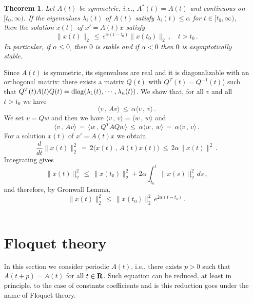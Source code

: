 \documentclass[12pt]{report}
\newcommand{\bR}{{\bf R}}
\newtheorem{theorem}{Theorem}[section]
\newcommand{\proof}{\noindent {\em Proof:~}}
\def\qed{\hbox{\hskip 6pt\vrule width6pt height7pt depth1pt
    \hskip1pt}\bigskip}
\begin{document}
\begin{theorem} Let $A(t)$ be symmetric, i.e., $A^{*}(t) =A(t)$ and 
continuous on $[t_0, \infty)$. If the eigenvalues $\lambda_i(t)$ of 
$A(t)$ satisfy $\lambda_i(t) \le \alpha$ for $t \in [t_0, \infty)$, 
then the solution $x(t)$ of $x'=A(t) x$ satisfy
\begin{equation}
\|x(t) \|_2 \,\le\, e^{\alpha(t-t_0)} \|x(t_0)\|_2 \,, \quad t>t_0\,.
\end{equation}
In particular, if $\alpha \le 0$, then $0$ is stable and if $\alpha < 0$ 
then $0$ is asymptotically stable. 
\end{theorem}

\proof Since $A(t)$ is symmetric, its eigenvalues are real and it is
diagonalizable with an orthogonal matrix: there exists a matrix $Q(t)$ with  
$Q^T(t) = Q^{-1}(t)$) such that $Q^T(t) A(t) Q(t) = {\rm diag}(\lambda_1(t),
\cdots, \lambda_n(t))$.  We show that, for all $v$ and all $t>t_0$ we have  
\begin{equation} 
\langle v\,,\, Av \rangle\,\le \,  \alpha \langle v\,,\, v \rangle\,.
\end{equation}
We set  $v=Qw$ and then we have 
$\langle v\,,\,v \rangle = \langle w\,,\, w \rangle$ and 
\begin{equation}
\langle v\,,\, Av \rangle \,=\, \langle w\,,\, Q^T A Q w \rangle 
\,\le\, \alpha 
\langle w\,,\, w \rangle \,=\, \alpha \langle v\,,\, v \rangle \,.
\end{equation}
For a solution $x(t)$ of $x'=A(t)x$ we obtain  
\begin{equation}
\frac{d}{dt} \|x(t)\|^2_2 \,=\, 2 \langle x(t)\,,\, A(t) x(t) \rangle 
\,\le \, 2 \alpha \|x(t)\|^2\,. 
\end{equation}
Integrating gives 
\begin{equation}
\|x(t)\|_2^2 \,\le\, \|x(t_0)\|_2^2 + 2 \alpha \int_{t_0}^t  \|x(s)\|_2^2 \, 
ds \,,
\end{equation}
and therefore, by Gronwall Lemma, 
\begin{equation}
\|x(t)\|^2_2 \,\le \, \|x(t_0)\|_2^2 \,e^{2\alpha(t-t_0)}\,.
\end{equation}
\hfill \qed


\section{Floquet theory} \label{floquettheory}

In this section we consider periodic $A(t)$, i.e., there exists $p>0$ such that
$A(t+ p) =A(t)$ for all $t\in \bR$.  Such equation can be reduced, at least in principle, 
to the case of constants coefficients and is this reduction goes under the name of Floquet theory. 
\end{document}
